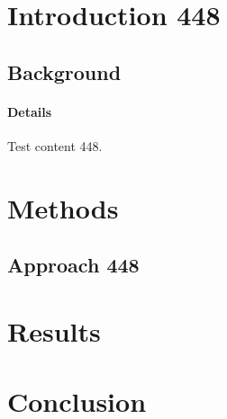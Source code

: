 \documentclass{article}
\begin{document}
\section{Introduction 448}
\subsection{Background}
\paragraph{Details} Test content 448.
\section{Methods}
\subsection{Approach 448}
\section{Results}
\section{Conclusion}
\end{document}
